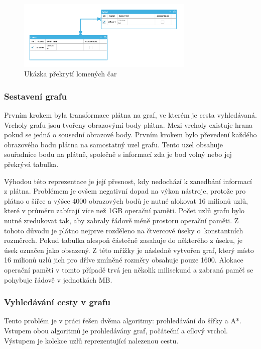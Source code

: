\documentclass[czech,bachelor,public,dept460,male,oneside]{diploma}
\begin{document}
	\begin{figure}[!h]
		\centering
		\includegraphics[width=0.75\textwidth]{Figures/ScreenLineOverSelf}
		\caption{Ukázka překrytí lomených čar}
		\label{fig:screenLinesOverlay}
	\end{figure}
	
	\subsubsection{Sestavení grafu} \label{secCreateGraph}
	Prvním krokem byla transformace plátna na graf, ve kterém je cesta vyhledávaná. Vrcholy grafu jsou tvořeny obrazovými body plátna. Mezi vrcholy existuje hrana  pokud se jedná o sousední obrazové body. Prvním krokem bylo převedení každého obrazového bodu plátna na samostatný uzel grafu. Tento uzel obsahuje souřadnice bodu na plátně, společně s informací zda je bod volný nebo jej překrývá tabulka.
	
	Výhodou této reprezentace je její přesnost, kdy nedochází k zanedbání informací z plátna. Problémem je ovšem negativní dopad na výkon nástroje, protože pro plátno o šířce a výšce 4000 obrazových bodů je nutné alokovat 16 milionů uzlů, které v průměru zabírají více než 1GB operační paměti. Počet uzlů grafu bylo nutné zredukovat tak, aby zabraly řádově méně prostoru operační paměti. Z tohoto důvodu je plátno nejprve rozděleno na čtvercové úseky o~konstantních rozměrech. Pokud tabulka alespoň částečně zasahuje do některého z úseku, je úsek označen jako obsazený. Z této mřížky je následně vytvořen graf, který místo 16 milionů uzlů jich pro dříve zmíněné rozměry obsahuje pouze 1600. Alokace operační paměti v tomto případě trvá jen několik milisekund a zabraná paměť se pohybuje řádově v jednotkách MB.
	
	\subsubsection{Vyhledávání cesty v grafu}
	Tento problém je v práci řešen dvěma algoritmy: prohledávání do šířky a A*. Vstupem obou algoritmů je prohledávány graf, počáteční a cílový vrchol. Výstupem je kolekce uzlů reprezentující nalezenou cestu.
	
\end{document}
